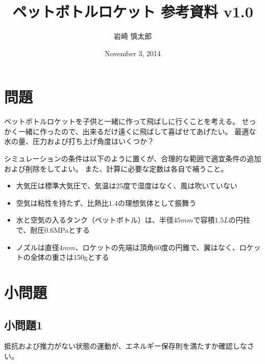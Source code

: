 \documentclass{article}
\title{ ペットボトルロケット 参考資料 v1.0 }
\author{ 岩崎 慎太郎 }
\begin{document}
\date{November 3, 2014}
\maketitle

\section{ 問題 }

ペットボトルロケットを子供と一緒に作って飛ばしに行くことを考える。
せっかく一緒に作ったので、出来るだけ遠くに飛ばして喜ばせてあげたい。
最適な水の量、圧力および打ち上げ角度はいくつか？

シミュレーションの条件は以下のように置くが、合理的な範囲で適宜条件の追加および削除をしてよい。
また、計算に必要な定数は各自で補うこと。

\begin{itemize}
\item 大気圧は標準大気圧で、気温は25度で湿度はなく、風は吹いていない
\item 空気は粘性を持たず、比熱比$1.4$の理想気体として振舞う
\item 水と空気の入るタンク（ペットボトル）は、半径$45mm$で容積$1.5L$の円柱で、耐圧0.6MPaとする
\item ノズルは直径$4mm$、ロケットの先端は頂角60度の円錐で、翼はなく、ロケットの全体の重さは150gとする
\end{itemize}


\section{ 小問題 }

\subsection{ 小問題1 }

抵抗および推力がない状態の運動が、エネルギー保存則を満たすか確認しなさい。
\end{document}
